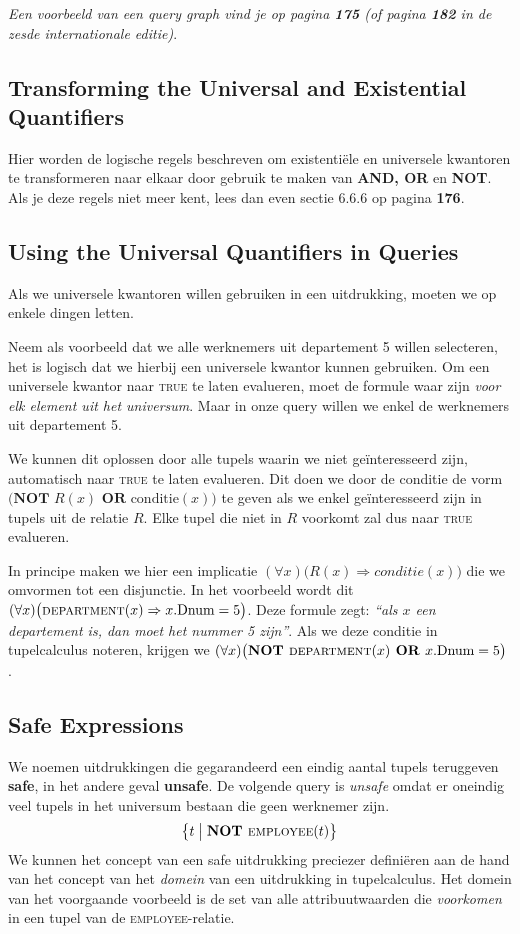 \textit{Een voorbeeld van een query graph vind je op pagina \textbf{175} (of pagina \textbf{182} in de zesde internationale editie)}.


\subsection{Transforming the Universal and Existential Quantifiers}
Hier worden de logische regels beschreven om existenti\"ele en universele kwantoren te transformeren naar elkaar door gebruik te maken van \textbf{AND, OR} en \textbf{NOT}. Als je deze regels niet meer kent, lees dan even sectie 6.6.6 op pagina \textbf{176}.


\subsection{Using the Universal Quantifiers in Queries}
Als we universele kwantoren willen gebruiken in een uitdrukking, moeten we op enkele dingen letten.

Neem als voorbeeld dat we alle werknemers uit departement 5 willen selecteren, het is logisch dat we hierbij een universele kwantor kunnen gebruiken. Om een universele kwantor naar \textsc{true} te laten evalueren, moet de formule waar zijn \textit{voor elk element uit het universum}. Maar in onze query willen we enkel de werknemers uit departement 5.

We kunnen dit oplossen door alle tupels waarin we niet ge\"interesseerd zijn, automatisch naar \textsc{true} te laten evalueren. Dit doen we door de conditie de vorm $\big(\textbf{NOT } R(x) \textbf{ OR } \text{conditie}(x) \big)$ te geven als we enkel ge\"interesseerd zijn in tupels uit de relatie $R$. Elke tupel die niet in $R$ voorkomt zal dus naar \textsc{true} evalueren.

In principe maken we hier een implicatie $(\forall x)\big( R(x) \Rightarrow \textit{conditie}(x) \big)$ die we omvormen tot een disjunctie. In het voorbeeld wordt dit $(\forall x)\big( \textsc{department}(x) \Rightarrow x.\text{Dnum}=5 \big)$. Deze formule zegt: \textit{``als $x$ een departement is, dan moet het nummer 5 zijn''}. Als we deze conditie in tupelcalculus noteren, krijgen we $(\forall x)\big( \textbf{NOT } \textsc{department}(x) \textbf{ OR } x.\text{Dnum}=5 \big)$.


\subsection{Safe Expressions}
We noemen uitdrukkingen die gegarandeerd een eindig aantal tupels teruggeven \textbf{safe}, in het andere geval \textbf{unsafe}. De volgende query is \textit{unsafe} omdat er oneindig veel tupels in het universum bestaan die geen werknemer zijn.
\vspace{-2mm}
\[ \big\{ t \bigm| \textbf{NOT } \textsc{employee}(t) \big\} \]
We kunnen het concept van een safe uitdrukking preciezer defini\"eren aan de hand van het concept van het \textit{domein} van een uitdrukking in tupelcalculus. Het domein van het voorgaande voorbeeld is de set van alle attribuutwaarden die \textit{voorkomen} in een tupel van de \textsc{employee}-relatie.

